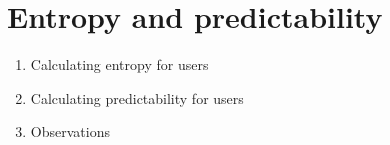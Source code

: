 \chapter{Entropy and predictability}
\begin{enumerate}
  \item Calculating entropy for users
  \item Calculating predictability for users
  \item Observations 
\end{enumerate}